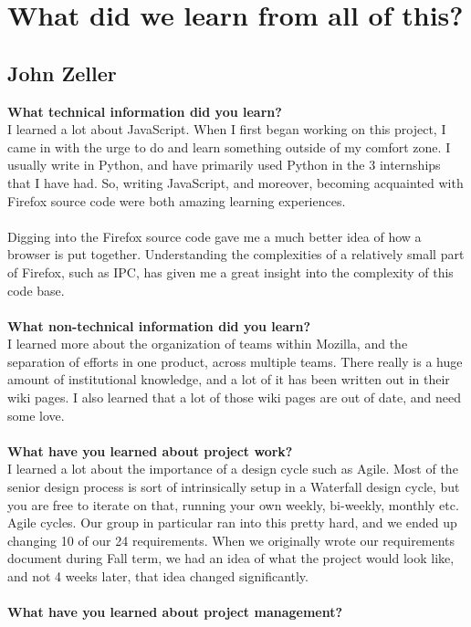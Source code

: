 \documentclass[12pt]{article}
\begin{document}
\section{What did we learn from all of this?}
\subsection{John Zeller}
\textbf{What technical information did you learn?}\\
I learned a lot about JavaScript. When I first began working on this project, I came in with the urge to do and learn something outside of my comfort zone. I usually write in Python, and have primarily used Python in the 3 internships that I have had. So, writing JavaScript, and moreover, becoming acquainted with Firefox source code were both amazing learning experiences.
\\\\
Digging into the Firefox source code gave me a much better idea of how a browser is put together. Understanding the complexities of a relatively small part of Firefox, such as IPC, has given me a great insight into the complexity of this code base.
\\\\
\textbf{What non-technical information did you learn?}\\
I learned more about the organization of teams within Mozilla, and the separation of efforts in one product, across multiple teams. There really is a huge amount of institutional knowledge, and a lot of it has been written out in their wiki pages. I also learned that a lot of those wiki pages are out of date, and need some love.
\\\\
\textbf{What have you learned about project work?}\\
I learned a lot about the importance of a design cycle such as Agile. Most of the senior design process is sort of intrinsically setup in a Waterfall design cycle, but you are free to iterate on that, running your own weekly, bi-weekly, monthly etc. Agile cycles. Our group in particular ran into this pretty hard, and we ended up changing 10 of our 24 requirements. When we originally wrote our requirements document during Fall term, we had an idea of what the project would look like, and not 4 weeks later, that idea changed significantly.
\\\\
\textbf{What have you learned about project management?}\\
\end{document}

